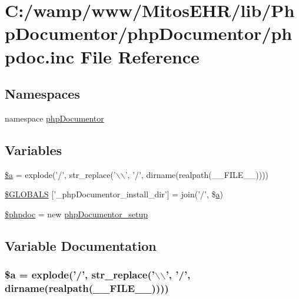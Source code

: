 \hypertarget{phpdoc_8inc}{\section{\-C\-:/wamp/www/\-Mitos\-E\-H\-R/lib/\-Php\-Documentor/php\-Documentor/phpdoc.inc \-File \-Reference}
\label{phpdoc_8inc}
}
\subsection*{\-Namespaces}
\begin{DoxyCompactItemize}
\item 
namespace \hyperlink{namespacephp_documentor}{php\-Documentor}
\end{DoxyCompactItemize}
\subsection*{\-Variables}
\begin{DoxyCompactItemize}
\item 
\hyperlink{phpdoc_8inc_acebf83966ef6d7e5645a6b62ba368f9f}{\$a} = explode('/', str\-\_\-replace('$\backslash$$\backslash$', '/', dirname(realpath(\-\_\-\-\_\-\-F\-I\-L\-E\-\_\-\-\_\-))))
\item 
\hyperlink{phpdoc_8inc_ae0c9701833ee906c21a6feb972ab268d}{\$\-G\-L\-O\-B\-A\-L\-S} \mbox{[}'\-\_\-php\-Documentor\-\_\-install\-\_\-dir'\mbox{]} = join('/', \$\hyperlink{classa}{a})
\item 
\hyperlink{phpdoc_8inc_a1228ff819addc21a3136c1ae2664aa7a}{\$phpdoc} = new \hyperlink{classphp_documentor__setup}{php\-Documentor\-\_\-setup}
\end{DoxyCompactItemize}


\subsection{\-Variable \-Documentation}
\hypertarget{phpdoc_8inc_acebf83966ef6d7e5645a6b62ba368f9f}{
\subsubsection[{\$a}]{\setlength{\rightskip}{0pt plus 5cm}\${\bf a} = explode('/', str\-\_\-replace('$\backslash$$\backslash$', '/', dirname(realpath(\-\_\-\-\_\-\-F\-I\-L\-E\-\_\-\-\_\-))))}}\label{phpdoc_8inc_acebf83966ef6d7e5645a6b62ba368f9f}


